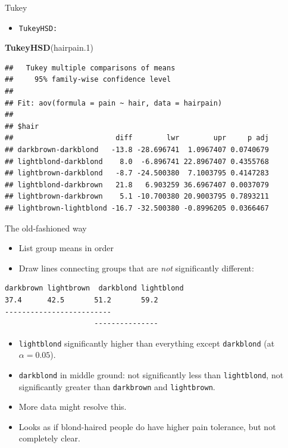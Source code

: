 \documentclass[ignorenonframetext,]{beamer}
\newenvironment{Shaded}{\begin{snugshade}}{\end{snugshade}}
\newcommand{\FloatTok}[1]{\textcolor[rgb]{0.00,0.00,0.81}{#1}}
\newcommand{\KeywordTok}[1]{\textcolor[rgb]{0.13,0.29,0.53}{\textbf{#1}}}
\newcommand{\NormalTok}[1]{#1}
\providecommand{\tightlist}{%
  \setlength{\itemsep}{0pt}\setlength{\parskip}{0pt}}
\begin{document}
\begin{frame}[fragile]{Tukey}
\protect\hypertarget{tukey}{}

\begin{itemize}
\tightlist
\item
  \texttt{TukeyHSD:}
\end{itemize}

\footnotesize

\begin{Shaded}
\begin{Highlighting}[]
\KeywordTok{TukeyHSD}\NormalTok{(hairpain}\FloatTok{.1}\NormalTok{)}
\end{Highlighting}
\end{Shaded}

\begin{verbatim}
##   Tukey multiple comparisons of means
##     95% family-wise confidence level
## 
## Fit: aov(formula = pain ~ hair, data = hairpain)
## 
## $hair
##                        diff        lwr        upr     p adj
## darkbrown-darkblond   -13.8 -28.696741  1.0967407 0.0740679
## lightblond-darkblond    8.0  -6.896741 22.8967407 0.4355768
## lightbrown-darkblond   -8.7 -24.500380  7.1003795 0.4147283
## lightblond-darkbrown   21.8   6.903259 36.6967407 0.0037079
## lightbrown-darkbrown    5.1 -10.700380 20.9003795 0.7893211
## lightbrown-lightblond -16.7 -32.500380 -0.8996205 0.0366467
\end{verbatim}

\normalsize

\end{frame}

\begin{frame}[fragile]{The old-fashioned way}
\protect\hypertarget{the-old-fashioned-way}{}

\begin{itemize}
\item
  List group means in order
\item
  Draw lines connecting groups that are \emph{not} significantly
  different:
\end{itemize}

\begin{verbatim}
darkbrown lightbrown  darkblond lightblond
37.4      42.5       51.2       59.2
-------------------------
                     ---------------
\end{verbatim}

\begin{itemize}
\item
  \texttt{lightblond} significantly higher than everything except
  \texttt{darkblond} (at \(\alpha=0.05\)).
\item
  \texttt{darkblond} in middle ground: not significantly less than
  \texttt{lightblond}, not significantly greater than \texttt{darkbrown}
  and \texttt{lightbrown}.
\item
  More data might resolve this.
\item
  Looks as if blond-haired people do have higher pain tolerance, but not
  completely clear.
\end{itemize}

\end{frame}
\end{document}
